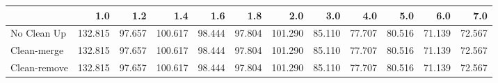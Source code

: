 \begin{tabular}{lrrrrrrrrrrr}
\toprule
{} &     1.0 &    1.2 &     1.4 &    1.6 &    1.8 &     2.0 &    3.0 &    4.0 &    5.0 &    6.0 &    7.0 \\
\midrule
No Clean Up  & 132.815 & 97.657 & 100.617 & 98.444 & 97.804 & 101.290 & 85.110 & 77.707 & 80.516 & 71.139 & 72.567 \\
Clean-merge  & 132.815 & 97.657 & 100.617 & 98.444 & 97.804 & 101.290 & 85.110 & 77.707 & 80.516 & 71.139 & 72.567 \\
Clean-remove & 132.815 & 97.657 & 100.617 & 98.444 & 97.804 & 101.290 & 85.110 & 77.707 & 80.516 & 71.139 & 72.567 \\
\bottomrule
\end{tabular}
